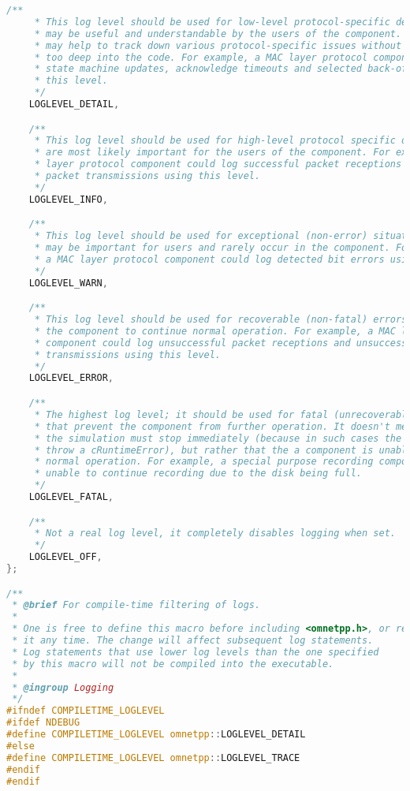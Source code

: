 \begin{lstlisting}[language=c]
    /**
     * This log level should be used for low-level protocol-specific details that
     * may be useful and understandable by the users of the component. These messages
     * may help to track down various protocol-specific issues without actually looking
     * too deep into the code. For example, a MAC layer protocol component could log
     * state machine updates, acknowledge timeouts and selected back-off periods using
     * this level.
     */
    LOGLEVEL_DETAIL,

    /**
     * This log level should be used for high-level protocol specific details that
     * are most likely important for the users of the component. For example, a MAC
     * layer protocol component could log successful packet receptions and successful
     * packet transmissions using this level.
     */
    LOGLEVEL_INFO,

    /**
     * This log level should be used for exceptional (non-error) situations that
     * may be important for users and rarely occur in the component. For example,
     * a MAC layer protocol component could log detected bit errors using this level.
     */
    LOGLEVEL_WARN,

    /**
     * This log level should be used for recoverable (non-fatal) errors that allow
     * the component to continue normal operation. For example, a MAC layer protocol
     * component could log unsuccessful packet receptions and unsuccessful packet
     * transmissions using this level.
     */
    LOGLEVEL_ERROR,

    /**
     * The highest log level; it should be used for fatal (unrecoverable) errors
     * that prevent the component from further operation. It doesn't mean that
     * the simulation must stop immediately (because in such cases the code should
     * throw a cRuntimeError), but rather that the a component is unable to continue
     * normal operation. For example, a special purpose recording component may be
     * unable to continue recording due to the disk being full.
     */
    LOGLEVEL_FATAL,

    /**
     * Not a real log level, it completely disables logging when set.
     */
    LOGLEVEL_OFF,
};

/**
 * @brief For compile-time filtering of logs.
 *
 * One is free to define this macro before including <omnetpp.h>, or redefine
 * it any time. The change will affect subsequent log statements.
 * Log statements that use lower log levels than the one specified
 * by this macro will not be compiled into the executable.
 *
 * @ingroup Logging
 */
#ifndef COMPILETIME_LOGLEVEL
#ifdef NDEBUG
#define COMPILETIME_LOGLEVEL omnetpp::LOGLEVEL_DETAIL
#else
#define COMPILETIME_LOGLEVEL omnetpp::LOGLEVEL_TRACE
#endif
#endif


\end{lstlisting}
